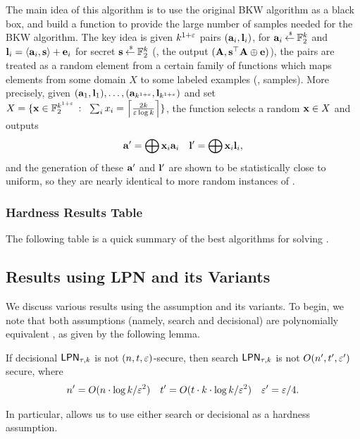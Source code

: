 The main idea of this algorithm is to use the original BKW algorithm as a black box, and build a function to provide the large number of samples needed for the BKW algorithm.
The key idea is given $k^{1+\varepsilon}$ pairs $({\mathbf a}_i, {\mathbf l}_i)$, for ${\mathbf a}_i \mathbin{\stackrel{\mbox{\,\tiny \$}}{\gets}} {\mathbb F}_2^k$ and $\bl_i = \ip{\ba_i}{\bs} +\be_i$ for secret ${\mathbf s}\mathbin{\stackrel{\mbox{\,\tiny \$}}{\gets}} {\mathbb F}_2^k$ (\ie, the output $({\mathbf A}, {\mathbf s}^\top{\mathbf A}\oplus {\mathbf e})$), the pairs are treated as a random element from a certain family of functions which maps elements from some domain $X$ to some labeled examples (\ie, samples).
More precisely, given $({\mathbf a}_1,{\mathbf l}_1),\dotsc,({\mathbf a}_{k^{1+\varepsilon}}, {\mathbf l}_{k^{1+\varepsilon}})$ and set $X = \{ {\mathbf x} \in {\mathbb F}_2^{k^{1+\varepsilon}}~\colon~\sum_ix_i = \left\lceil{\frac{2k}{\ensuremath{\varepsilon}\log k}}\right\rceil \}$, the function selects a random ${\mathbf x} \in X$ and outputs
\begin{align*}
	{\mathbf a}' = \bigoplus {\mathbf x}_i{\mathbf a}_i & & {\mathbf l}' = \bigoplus {\mathbf x}_i{\mathbf l}_i,
\end{align*}
and the generation of these ${\mathbf a}'$ and ${\mathbf l}'$ are shown to be statistically close to uniform, so they are nearly identical to more random instances of \LPN.

\subsubsection{Hardness Results Table}
The following table is a quick summary of the best algorithms for solving \LPN.



\subsection{Results using LPN and its Variants}
We discuss various results using the \LPN assumption and its variants.
To begin, we note that both \LPN assumptions (namely, search and decisional) are polynomially equivalent \cite{C:BFKL93,JC:KatShiSmi10}, as given by the following lemma.

\begin{importedlemma}\label{implem:lpn-poly}
	If decisional $\mathsf{LPN}_{\tau, k}$ is not $(n,t,\varepsilon)$-secure, then search $\mathsf{LPN}_{\tau,k}$ is not $O(n',t',\varepsilon')$ secure, where
	\begin{align*}
	n' = O(n\cdot \log k/\varepsilon^2) & & t' = O(t\cdot k \cdot \log k/\varepsilon^2) & & \varepsilon' = \varepsilon/4.
	\end{align*}
\end{importedlemma}

In particular,  allows us to use either search or decisional \LPN as a hardness assumption.

